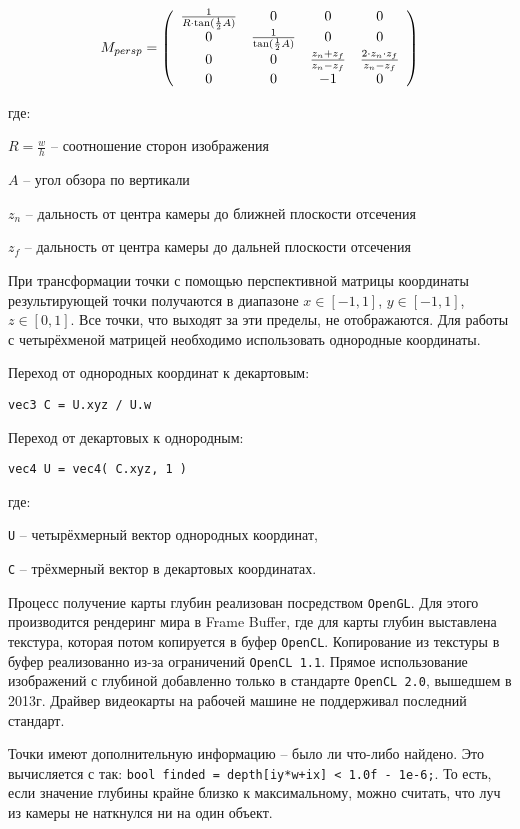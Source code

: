 $$
M_{persp} = \left( \begin{array}{c c c c}
        \frac{1}{ R \cdot \tan( \frac{1}{2} A ) } & 0 & 0 & 0 \\
        0 & \frac{1}{ \tan( \frac{1}{2} A ) } & 0 & 0 \\
        0 & 0 & \frac{ z_{n} + z_{f} }{ z_{n}-z_{f} } & \frac{ 2 \cdot z_{n} \cdot z_{f} }{ z_{n} - z_{f} } \\
        0 & 0 & -1 & 0
\end{array} \right)
$$

где:

$R = \frac{w}{h}$ -- соотношение сторон изображения

$A$ -- угол обзора по вертикали

$z_{n}$ -- дальность от центра камеры до ближней плоскости отсечения

$z_{f}$ -- дальность от центра камеры до дальней плоскости отсечения

При трансформации точки с помощью перспективной матрицы координаты результирующей
точки получаются в диапазоне $x \in [-1,1]$, $y \in [-1,1]$, $z \in [0,1]$.
Все точки, что выходят за эти пределы, не отображаются. Для работы с
четырёхменой матрицей необходимо использовать однородные координаты.

Переход от однородных координат к декартовым: 

\verb|vec3 C = U.xyz / U.w|

Переход от декартовых к однородным:

\verb|vec4 U = vec4( C.xyz, 1 )|

где:

\verb|U| -- четырёхмерный вектор однородных координат,

\verb|C| -- трёхмерный вектор в декартовых координатах.

Процесс получение карты глубин реализован посредством \verb|OpenGL|. Для этого 
производится рендеринг мира в Frame Buffer, где для карты глубин выставлена
текстура, которая потом копируется в буфер \verb|OpenCL|.
Копирование из текстуры в буфер реализованно из-за ограничений
\verb|OpenCL 1.1|. Прямое использование изображений с глубиной добавленно
только в стандарте \verb|OpenCL 2.0|, вышедшем в 2013г.
Драйвер видеокарты на рабочей машине не поддерживал последний стандарт.

Точки имеют дополнительную информацию -- было ли что-либо найдено.
Это вычисляется с так: \verb|bool finded = depth[iy*w+ix] < 1.0f - 1e-6;|.
То есть, если значение глубины крайне близко к максимальному, можно считать, что
луч из камеры не наткнулся ни на один объект.

